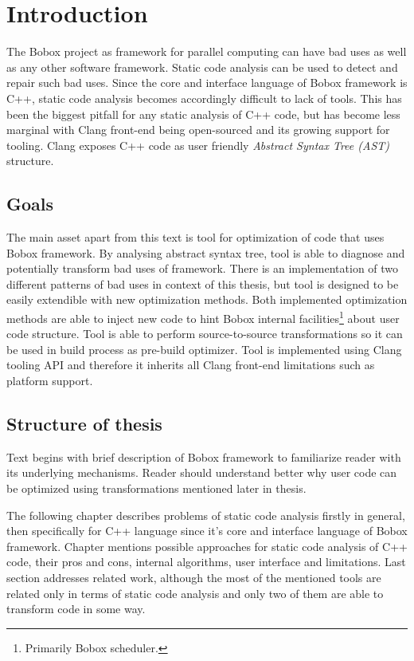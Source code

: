 \chapter{Introduction}
The Bobox project as framework for parallel computing can have bad uses as well as any other software framework. Static code analysis can be used to detect and repair such bad uses. Since the core and interface language of Bobox framework is C++, static code analysis becomes accordingly difficult to lack of tools. This has been the biggest pitfall for any static analysis of C++ code, but has become less marginal with Clang front-end being open-sourced and its growing support for tooling. Clang exposes C++ code as user friendly \emph{Abstract Syntax Tree (AST)} structure.

\section{Goals}
The main asset apart from this text is tool for optimization of code that uses Bobox framework. By analysing abstract syntax tree, tool is able to diagnose and potentially transform bad uses of framework. There is an implementation of two different patterns of bad uses in context of this thesis, but tool is designed to be easily extendible with new optimization methods. Both implemented optimization methods are able to inject new code to hint Bobox internal facilities\footnote{Primarily Bobox scheduler.} about user code structure. Tool is able to perform source-to-source transformations so it can be used in build process as pre-build optimizer. Tool is implemented using Clang tooling API and therefore it inherits all Clang front-end limitations such as platform support.

\section{Structure of thesis}
Text begins with brief description of Bobox framework to familiarize reader with its underlying mechanisms. Reader should understand better why user code can be optimized using transformations mentioned later in thesis.

The following chapter describes problems of static code analysis firstly in general, then specifically for C++ language since it's core and interface language of Bobox framework. Chapter mentions possible approaches for static code analysis of C++ code, their pros and cons, internal algorithms, user interface and limitations. Last section addresses related work, although the most of the mentioned tools are related only in terms of static code analysis and only two of them are able to transform code in some way.

